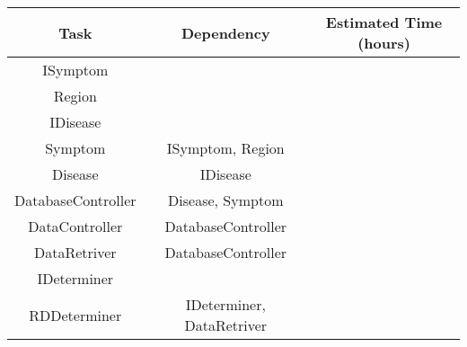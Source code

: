 \begin{center}
	\begin{tabular}[h]{|c|c|c|}
		\hline
		Task & Dependency & Estimated Time (hours) \\ \hline
		ISymptom & & \\ \hline
		Region & &  \\ \hline
		IDisease & &  \\ \hline
		Symptom & ISymptom, Region &  \\ \hline
		Disease & IDisease & \\ \hline
		DatabaseController & Disease, Symptom & \\ \hline
		DataController & DatabaseController &  \\ \hline
		DataRetriver & DatabaseController & \\ \hline
		IDeterminer & &  \\ \hline
		RDDeterminer & IDeterminer, DataRetriver & \\ \hline
	\end{tabular}
\end{center}

